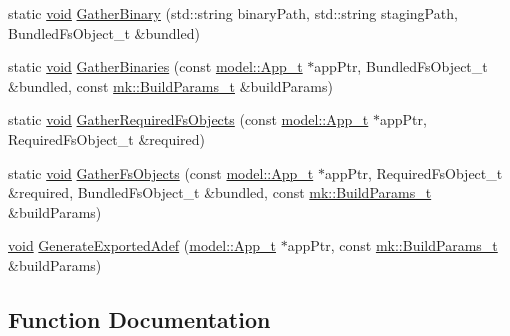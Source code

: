 \begin{DoxyCompactItemize}
\item 
static \hyperlink{_t_e_m_p_l_a_t_e__cdef_8h_ac9c84fa68bbad002983e35ce3663c686}{void} \hyperlink{namespaceadef_gen_ad425fd3ff70e659287d7f873cd42b15d}{Gather\+Binary} (std\+::string binary\+Path, std\+::string staging\+Path, Bundled\+Fs\+Object\+\_\+t \&bundled)
\item 
static \hyperlink{_t_e_m_p_l_a_t_e__cdef_8h_ac9c84fa68bbad002983e35ce3663c686}{void} \hyperlink{namespaceadef_gen_a42548a453051c9a073ef297d816c807b}{Gather\+Binaries} (const \hyperlink{structmodel_1_1_app__t}{model\+::\+App\+\_\+t} $\ast$app\+Ptr, Bundled\+Fs\+Object\+\_\+t \&bundled, const \hyperlink{structmk_1_1_build_params__t}{mk\+::\+Build\+Params\+\_\+t} \&build\+Params)
\item 
static \hyperlink{_t_e_m_p_l_a_t_e__cdef_8h_ac9c84fa68bbad002983e35ce3663c686}{void} \hyperlink{namespaceadef_gen_ab64238877fe1fbf26ede859f9756d75e}{Gather\+Required\+Fs\+Objects} (const \hyperlink{structmodel_1_1_app__t}{model\+::\+App\+\_\+t} $\ast$app\+Ptr, Required\+Fs\+Object\+\_\+t \&required)
\item 
static \hyperlink{_t_e_m_p_l_a_t_e__cdef_8h_ac9c84fa68bbad002983e35ce3663c686}{void} \hyperlink{namespaceadef_gen_af3eb95aca130c65c8ebbcfc54589d578}{Gather\+Fs\+Objects} (const \hyperlink{structmodel_1_1_app__t}{model\+::\+App\+\_\+t} $\ast$app\+Ptr, Required\+Fs\+Object\+\_\+t \&required, Bundled\+Fs\+Object\+\_\+t \&bundled, const \hyperlink{structmk_1_1_build_params__t}{mk\+::\+Build\+Params\+\_\+t} \&build\+Params)
\item 
\hyperlink{_t_e_m_p_l_a_t_e__cdef_8h_ac9c84fa68bbad002983e35ce3663c686}{void} \hyperlink{namespaceadef_gen_a7ad60e4fbb58b3029d21df1094621ad4}{Generate\+Exported\+Adef} (\hyperlink{structmodel_1_1_app__t}{model\+::\+App\+\_\+t} $\ast$app\+Ptr, const \hyperlink{structmk_1_1_build_params__t}{mk\+::\+Build\+Params\+\_\+t} \&build\+Params)
\end{DoxyCompactItemize}


\subsection{Function Documentation}
